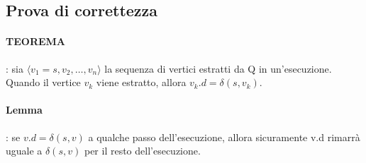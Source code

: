 \subsection{Prova di correttezza}
\paragraph*{TEOREMA}: sia $\langle v_1 = s,v_2,\dots,v_n \rangle$ la sequenza di vertici
estratti da Q in un'esecuzione. Quando il vertice $v_k$ viene estratto, allora $v_k.d = \delta
(s,v_k)$.
\paragraph*{Lemma}: se $v.d=\delta(s,v)$ a qualche passo dell'esecuzione, allora sicuramente
v.d rimarrà uguale a $\delta(s,v)$ per il resto dell'esecuzione.
